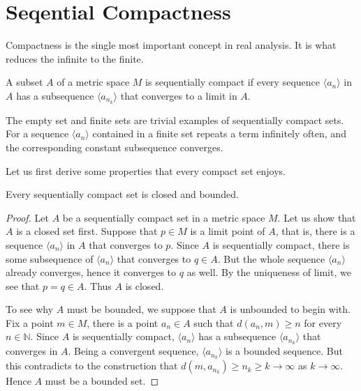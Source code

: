 \section{Seqential Compactness}
\label{sec:seq-comp}

Compactness is the single most important concept in real analysis.
It is what reduces the infinite to the finite.

\begin{defn}
  A subset $A$ of a metric space $M$ is \textsf{sequentially compact} if every sequence $\langle a_n \rangle$ in $A$ has a subsequence $\langle a_{n_k} \rangle$ that converges to a limit in $A$.
\end{defn}

The empty set and finite sets are trivial examples of sequentially compact sets.
For a sequence $\langle a_n \rangle$ contained in a finite set repeats a term infinitely often, and the corresponding constant subsequence converges.

Let us first derive some properties that every compact set enjoys.

\begin{thm}
  \label{thm:cpt-closed-bounded}
  Every sequentially compact set is closed and bounded.
\end{thm}

\begin{proof}
  Let $A$ be a sequentially compact set in a metric space $M$.
  Let us show that $A$ is a closed set first.
  Suppose that $p \in M$ is a limit point of $A$,
  that is, there is a sequence $\langle a_n \rangle$ in $A$ that converges to $p$.
  Since $A$ is sequentially compact, there is some subsequence of $\langle a_n \rangle$ that converges to $q \in A$.
  But the whole sequence $\langle a_n \rangle$ already converges, hence it converges to $q$ as well.
  By the uniqueness of limit, we see that $p = q \in A$.
  Thus $A$ is closed.

  To see why $A$ must be bounded, we suppose that $A$ is unbounded to begin with.
  Fix a point $m \in M$, there is a point $a_n \in A$ such that $d(a_n, m) \geqslant n$ for every $n \in \mathbb{N}$.
  Since $A$ is sequentially compact, $\langle a_n \rangle$ has a subsequence $\langle a_{n_k} \rangle$ that converges in $A$.
  Being a convergent sequence, $\langle a_{n_k} \rangle$ is a bounded sequence.  But this contradicts to the construction that $d(m,a_{n_k}) \geqslant n_k \geqslant k \to \infty$ as $k \to \infty$.
  Hence $A$ must be a bounded set.
\end{proof}

